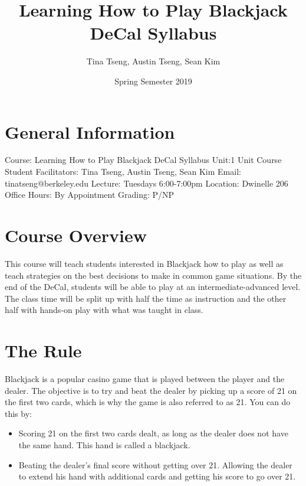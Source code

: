 \documentclass{article}
\title{Learning How to Play Blackjack DeCal Syllabus}
\author{Tina Tseng, Austin Tseng, Sean Kim}
\date{Spring Semester 2019}
\begin{document}
\maketitle

\section{General Information}

Course: Learning How to Play Blackjack DeCal Syllabus
\newline
Unit:1 Unit Course
\newline
Student Facilitators: Tina Tseng, Austin Tseng, Sean Kim
\newline
Email: tinatseng@berkeley.edu
\newline
Lecture: Tuesdays 6:00-7:00pm
\newline
Location: Dwinelle 206
\newline
Office Hours: By Appointment
\newline
Grading: P/NP

\section{Course Overview}
  This course will teach students interested in Blackjack how to play as well as teach strategies on the best decisions to make in common game situations. By the end of the DeCal, students will be able to play at an intermediate-advanced level. The class time will be split up with half the time as instruction and the other half with hands-on play with what was taught in class.
   
  
\section{The Rule}
Blackjack is a popular casino game that is played between the player and the dealer. The objective is to try and beat the dealer by picking up a score of 21 on the first two cards, which is why the game is also referred to as 21. You can do this by:

\begin{itemize}
    \item Scoring 21 on the first two cards dealt, as long as the dealer does not have the same hand. This hand is called a blackjack.
    \item Beating the dealer’s final score without getting over 21.
Allowing the dealer to extend his hand with additional cards and getting his score to go over 21.
\end{itemize}


  
\end{document}

